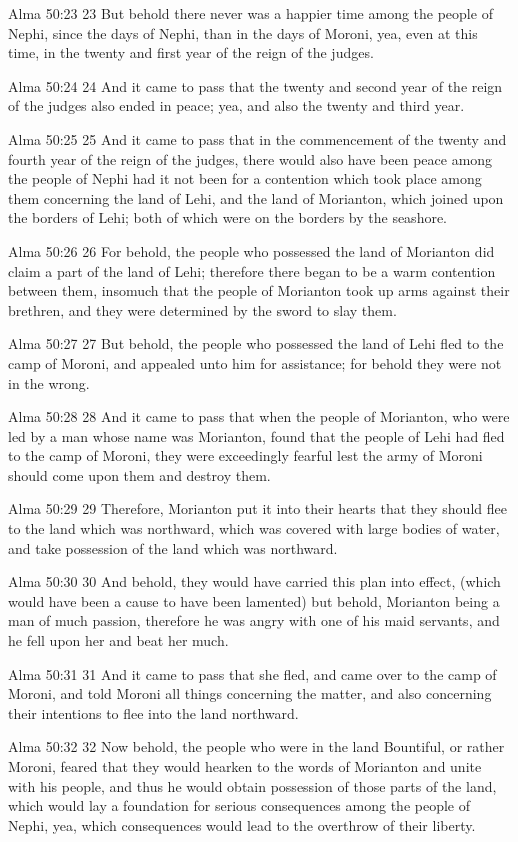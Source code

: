 Alma 50:23
 23 But behold there never was a happier time among the people of
Nephi, since the days of Nephi, than in the days of Moroni, yea,
even at this time, in the twenty and first year of the reign of
the judges.

Alma 50:24
 24 And it came to pass that the twenty and second year of the
reign of the judges also ended in peace; yea, and also the twenty
and third year.

Alma 50:25
 25 And it came to pass that in the commencement of the twenty
and fourth year of the reign of the judges, there would also have
been peace among the people of Nephi had it not been for a
contention which took place among them concerning the land of
Lehi, and the land of Morianton, which joined upon the borders of
Lehi; both of which were on the borders by the seashore.

Alma 50:26
 26 For behold, the people who possessed the land of Morianton
did claim a part of the land of Lehi; therefore there began to be
a warm contention between them, insomuch that the people of
Morianton took up arms against their brethren, and they were
determined by the sword to slay them.

Alma 50:27
 27 But behold, the people who possessed the land of Lehi fled to
the camp of Moroni, and appealed unto him for assistance; for
behold they were not in the wrong.

Alma 50:28
 28 And it came to pass that when the people of Morianton, who
were led by a man whose name was Morianton, found that the people
of Lehi had fled to the camp of Moroni, they were exceedingly
fearful lest the army of Moroni should come upon them and destroy
them.

Alma 50:29
 29 Therefore, Morianton put it into their hearts that they
should flee to the land which was northward, which was covered
with large bodies of water, and take possession of the land which
was northward.

Alma 50:30
 30 And behold, they would have carried this plan into effect,
(which would have been a cause to have been lamented) but behold,
Morianton being a man of much passion, therefore he was angry
with one of his maid servants, and he fell upon her and beat her
much.

Alma 50:31
 31 And it came to pass that she fled, and came over to the camp
of Moroni, and told Moroni all things concerning the matter, and
also concerning their intentions to flee into the land northward.

Alma 50:32
 32 Now behold, the people who were in the land Bountiful, or
rather Moroni, feared that they would hearken to the words of
Morianton and unite with his people, and thus he would obtain
possession of those parts of the land, which would lay a
foundation for serious consequences among the people of Nephi,
yea, which consequences would lead to the overthrow of their
liberty.

